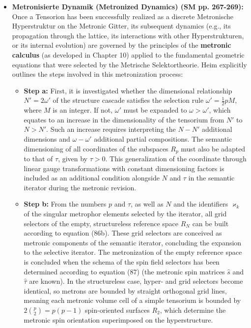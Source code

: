 \documentclass[12pt]{article}
\begin{document}
\begin{itemize}
\begin{enumerate}
\begin{itemize}
        \end{itemize}
    \end{enumerate}
    These Metronisierungsverfahren, acting collectively, ensure that the final, realized Metronische Hyperstruktur is not only geometrically stable (as per the selection of its parent Tensorion) but also fully compatible with the discrete, quantized nature of the fundamental Metronic Gitter.

    \item \textbf{Metronisierte Dynamik (Metronized Dynamics) (SM pp. 267-269):}
    Once a Tensorion has been successfully realized as a discrete Metronische Hyperstruktur on the Metronic Gitter, its subsequent dynamics (e.g., its propagation through the lattice, its interactions with other Hyperstrukturen, or its internal evolution) are governed by the principles of the \textbf{metronic calculus} (as developed in Chapter 10) applied to the fundamental geometric equations that were selected by the Metrische Selektortheorie. Heim explicitly outlines the steps involved in this metronization process:
    \begin{itemize}
        \item \textbf{Step a:} First, it is investigated whether the dimensional relationship \( N' = 2 \omega' \) of the structure cascade satisfies the selection rule \( \omega' = \frac{1}{2} pM \), where \( M \) is an integer. If not, \( \omega' \) must be expanded to \( \omega > \omega' \), which equates to an increase in the dimensionality of the tensorium from \( N' \) to \( N > N' \). Such an increase requires interpreting the \( N - N' \) additional dimensions and \( \omega - \omega' \) additional partial compositions. The semantic dimensioning of all coordinates of the subspaces \( R_p \) must also be adapted to that of \( \tau \), given by \( \tau > 0 \). This generalization of the coordinate through linear gauge transformations with constant dimensioning factors is included as an additional condition alongside \( N \) and \( \tau \) in the semantic iterator during the metronic revision.
        \item \textbf{Step b:} From the numbers \( p \) and \( \tau \), as well as \( N \) and the identifiers \( \varkappa_k \) of the singular metrophor elements selected by the iterator, all grid selectors of the empty, structureless reference space \( R_N \) can be built according to equation (86b). These grid selectors are conceived as metronic components of the semantic iterator, concluding the expansion to the selective iterator. The metronization of the empty reference space is concluded when the schema of the spin field selectors has been determined according to equation (87) (the metronic spin matrices \(\hat{s}\) and \(\hat{\tau}\) are known). In the structureless case, hyper- and grid selectors become identical, so metrons are bounded by straight orthogonal grid lines, meaning each metronic volume cell of a simple tensorium is bounded by \( 2\binom{p}{2} = p(p-1) \) spin-oriented surfaces \( R_2 \), which determine the metronic spin orientation superimposed on the hyperstructure.

\end{itemize}
\end{itemize}
\end{document}
